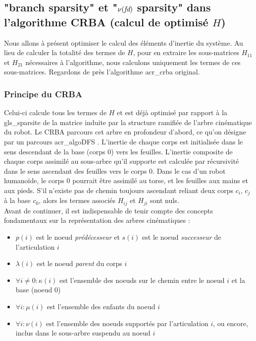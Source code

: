 \documentclass{report}
\begin{document}
\subsection{"branch sparsity" et "$\nu(\emph{fd})$ sparsity" dans l'algorithme CRBA (calcul de optimisé $H$)}

Nous allons à présent optimiser le calcul des éléments d'inertie du système. Au lieu de calculer la totalité des termes de $H$, pour en extraire les sous-matrices $H_{11}$ et $H_{21}$ nécessaires à l'algorithme, nous calculons uniquement les termes de ces sous-matrices. Regardons de près l'algorithme \gls{acr_crba} original.\\

\subsubsection{Principe du CRBA}
Celui-ci calcule tous les termes de $H$ et est déjà optimisé par rapport à la \gls{gls_sparsite} de la matrice induite par la structure ramifiée de l'arbre cinématique du robot. Le CRBA parcours cet arbre en profondeur d'abord, ce qu'on désigne par un parcours \gls{acr_algoDFS} \cite{bib_deepFirstSearch}. L'inertie de chaque corps est initialisée dans le sens descendant de la base (corps 0) vers les feuilles. L'inertie composite de chaque corps assimilé au sous-arbre qu'il supporte est calculée par récursivité dans le sens ascendant des feuilles vers le corps 0. Dans le cas d'un robot humanoïde, le corps 0 pourrait être assimilé au torse, et les feuilles aux mains et aux pieds. S'il n'existe pas de chemin toujours ascendant reliant deux corps $c_i$, $c_j$ à la base $c_0$, alors les termes associés $H_{ij}$ et $H_{ji}$ sont nuls.\\
Avant de continuer, il est indispensable de tenir compte des concepts fondamentaux sur la représentation des arbres cinématiques \cite{ch_algSpa_equationMouvement}:

\begin{itemize}
\item $p(i)$ est le noeud \emph{prédécesseur} et $s(i)$ est le noeud \emph{successeur} de l'articulation $i$
\item $\lambda(i)$ est le noeud \emph{parent} du corps $i$
\item $\forall i \neq 0: \kappa(i)$ est l'ensemble des noeuds sur le chemin entre le noeud $i$ et la base (noeud $0$)
\item $\forall i: \mu (i)$  est l'ensemble des enfants du noeud $i$
\item $\forall i: \nu (i)$  est l'ensemble des noeuds supportés par l'articulation $i$, ou encore, inclus dans le sous-arbre suspendu au noeud $i$
\end{itemize}
\end{document}
